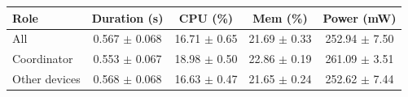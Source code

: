 \begin{tabular}{lcccc}
\hline
\textbf{Role} & \textbf{Duration (s)} & \textbf{CPU (\%)} & \textbf{Mem (\%)} & \textbf{Power (mW)} \\
\hline
All & 0.567 $\pm$ 0.068 & 16.71 $\pm$ 0.65 & 21.69 $\pm$ 0.33 & 252.94 $\pm$ 7.50 \\
Coordinator & 0.553 $\pm$ 0.067 & 18.98 $\pm$ 0.50 & 22.86 $\pm$ 0.19 & 261.09 $\pm$ 3.51 \\
Other devices & 0.568 $\pm$ 0.068 & 16.63 $\pm$ 0.47 & 21.65 $\pm$ 0.24 & 252.62 $\pm$ 7.44 \\
\hline
\end{tabular}
